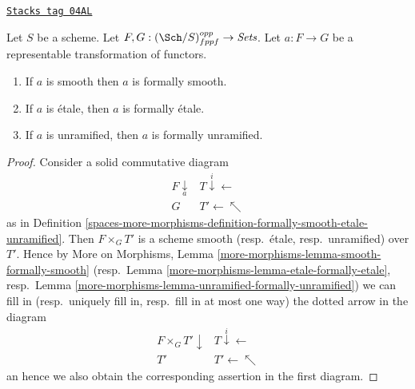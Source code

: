 \begin{lemma}
\label{spaces-more-morphisms-lemma-representable-property-formally-property}
\href{https://stacks.math.columbia.edu/tag/04AL}{\texttt{Stacks tag 04AL}}

Let $S$ be a scheme.
Let $F, G : (\Sch/S)_{fppf}^{opp} \to \textit{Sets}$.
Let $a : F \to G$ be a representable transformation of functors.
\begin{enumerate}
\item If $a$ is smooth then $a$ is formally smooth.
\item If $a$ is \'etale, then $a$ is formally \'etale.
\item If $a$ is unramified, then $a$ is formally unramified.
\end{enumerate}
\end{lemma}

\begin{proof}
Consider a solid commutative diagram
$$
\begin{array}{cc}F \underset{a}{\downarrow} & T \overset{i}{\downarrow}\longleftarrow \\ G & T' \longleftarrow\nwarrow\end{array}
$$
as in
Definition \ref{spaces-more-morphisms-definition-formally-smooth-etale-unramified}.
Then $F \times_G T'$ is a scheme smooth (resp.\ \'etale, resp.\ unramified)
over $T'$. Hence by
More on Morphisms, Lemma \ref{more-morphisms-lemma-smooth-formally-smooth}
(resp.\ Lemma \ref{more-morphisms-lemma-etale-formally-etale},
resp.\ Lemma \ref{more-morphisms-lemma-unramified-formally-unramified})
we can fill in (resp.\ uniquely fill in, resp.\ fill in at most
one way) the dotted arrow in the diagram
$$
\begin{array}{cc}F \times_G T' \downarrow & T \overset{i}{\downarrow}\longleftarrow \\ T' & T' \longleftarrow\nwarrow\end{array}
$$
an hence we also obtain the corresponding assertion in the first diagram.
\end{proof}

